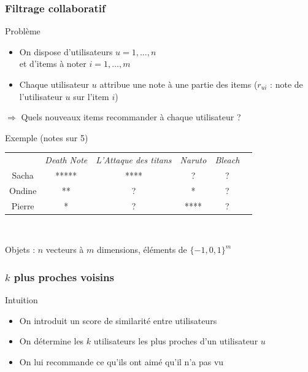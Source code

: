 \documentclass[handout]{beamer}
\begin{document}
\begin{frame}
	\frametitle{Filtrage collaboratif}
	\begin{block}{Problème}
		\begin{itemize}[<+->]
		\item On dispose d'utilisateurs $u = 1, \ldots, n$\\et d'items à noter $i = 1, \ldots, m$
		\item Chaque utilisateur $u$ attribue une note à une partie des items (\alert{$r_{ui}$} : note de l'utilisateur $u$ sur l'item $i$)
		\end{itemize}
		\pause
		$\Rightarrow$ Quels nouveaux items recommander à chaque utilisateur ?
	\end{block}
	\pause
	\begin{exampleblock}{Exemple (notes sur 5)}
		\begin{tabular}{cccccc}
		& \emph{Death Note} & \emph{L'Attaque des titans} & \emph{Naruto} & \emph{Bleach}\\
		Sacha & ***** & **** & ? & ?\\
		Ondine & ** & ? & * & ?\\
		Pierre & * & ? & **** & ?
		\end{tabular}\\
	\end{exampleblock}
	\pause
	Objets : $n$ vecteurs à $m$ dimensions, éléments de $\{-1, 0, 1\}^m$
\end{frame}

\begin{frame}
	\frametitle{$k$ plus proches voisins}
	\begin{exampleblock}{Intuition}
		\begin{itemize}
		\item On introduit un score de similarité entre utilisateurs
		\item On détermine les $k$ utilisateurs les plus proches d'un utilisateur $u$
		\item On lui recommande ce qu'ils ont aimé qu'il n'a pas vu
		\end{itemize}
	\end{exampleblock}
\end{frame}

\def\R{\mathcal{R}}
\def\N{N}
\end{document}
